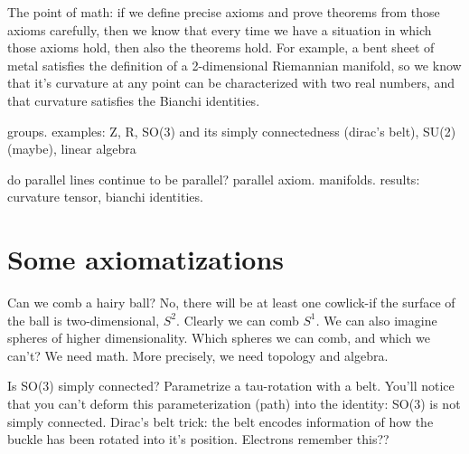\documentclass[11pt,%
]{memoir}
\begin{document}
The point of math: if we define precise axioms and prove theorems from those axioms carefully, then we know that every time we have a situation in which those axioms hold, then also the theorems hold. For example, a bent sheet of metal satisfies the definition of a 2-dimensional Riemannian manifold, so we know that it's curvature at any point can be characterized with two real numbers, and that curvature satisfies the Bianchi identities.

groups. examples: Z, R, SO(3) and its simply connectedness (dirac's belt), SU(2) (maybe), linear algebra

do parallel lines continue to be parallel? parallel axiom. manifolds. results: curvature tensor, bianchi identities.

\section{Some axiomatizations}


Can we comb a hairy ball? No, there will be at least one cowlick-if the surface of the ball is two-dimensional, \(S^2\). Clearly we can comb \(S^1\). We can also imagine spheres of higher dimensionality. Which spheres we can comb, and which we can't? We need math. More precisely, we need topology and algebra.

Is SO(3) simply connected? Parametrize a tau-rotation with a belt. You'll notice that you can't deform this parameterization (path) into the identity: SO(3) is not simply connected. Dirac's belt trick: the belt encodes information of how the buckle has been rotated into it's position. Electrons remember this??




\end{document}
